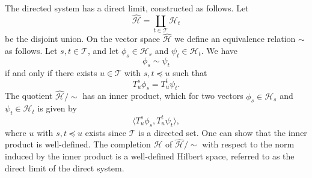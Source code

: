 \documentclass[11pt,oneside]{amsart}
\theoremstyle{plain}%
\theoremstyle{definition}
\theoremstyle{remark}
\begin{document}
The directed system has a direct limit, constructed as follows. Let
\begin{equation}
	\hat{\mathcal{H}}=\coprod_{t\in\mathcal{T}}\mathcal{H}_t
\end{equation}
be the disjoint union. On the vector space $\hat{\mathcal{H}}$ we define an equivalence relation $\sim$ as follows. Let $s, t\in\mathcal{T}$, and let $\phi_s\in\mathcal{H}_s$ and $\psi_t\in\mathcal{H}_t$. We have
\begin{equation}
	\phi_s\sim\psi_t
\end{equation}
if and only if there exists $u\in\mathcal{T}$ with $s, t\preceq u$ such that
\begin{equation}
	T^s_u \phi_s = T^t_u \psi_t.
\end{equation}
The quotient $\hat{\mathcal{H}}/{\sim}$ has an inner product, which for two vectors $\phi_s\in\mathcal{H}_s$ and $\psi_t\in\mathcal{H}_t$ is given by
\begin{equation}
	\langle T^s_u\phi_s, T^t_u\psi_t\rangle,
\end{equation}
where $u$ with $s, t\preceq u$ exists since $\mathcal{T}$ is a directed set. One can show that the inner product is well-defined. The completion $\mathcal{H}$ of $\hat{\mathcal{H}}/{\sim}$ with respect to the norm induced by the inner product is a well-defined Hilbert space, referred to as the direct limit of the direct system.
\end{document}
